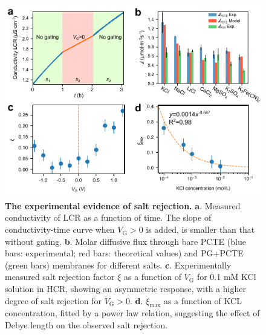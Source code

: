 \documentclass[journal=langd5,email=true, hyperref=true, keywords=false]{achemso}
\begin{document}
\begin{figure}[htbp]
  \centering
  \includegraphics[width=0.95\linewidth]{img/fig2.pdf}
  \caption{\textbf{The experimental evidence of salt rejection.}
    \textbf{a}. Measured conductivity of LCR as a function of
    time. The slope of conductivity-time curve when $V_{\mathrm{G}}>0$
    is added, is smaller than that without gating. \textbf{b}. Molar
    diffusive flux through bare PCTE (blue bars: experimental; red
    bars: theoretical values) and PG+PCTE (green bars) membranes for
    different salts. \textbf{c}. Experimentally measured salt
    rejection factor $\xi$ as a function of $V_{\mathrm{G}}$ for 0.1
    mM KCl solution in HCR, showing an asymmetric response, with a
    higher degree of salt rejection for
    $V_{\mathrm{G}}>0$. \textbf{d}. $\xi_{\mathrm{max}}$ as a function
    of KCL concentration, fitted by a power law relation, suggesting
    the effect of Debye length on the observed salt rejection. }
  \label{fig:2} 
\end{figure}
\end{document}
